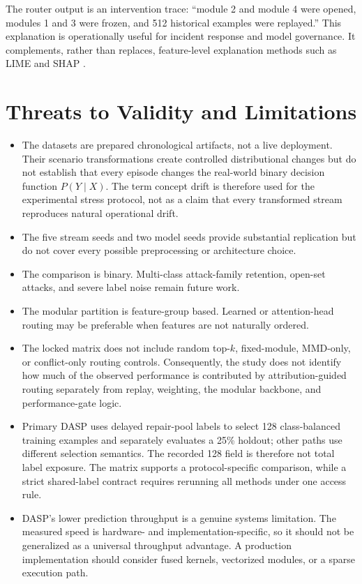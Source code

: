 \documentclass{ieeeaccess}
\newcommand{\discussionhead}[1]{%
  \par\addvspace{7pt}%
  \noindent{\color{greycolor}\bfseries\itshape #1}\par\nobreak\vspace{1pt}\nobreak}
\begin{document}
\discussionhead{Relation to interpretability}
The router output is an intervention trace: ``module 2 and module 4 were opened, modules 1 and 3 were frozen, and 512 historical examples were replayed.'' This explanation is operationally useful for incident response and model governance. It complements, rather than replaces, feature-level explanation methods such as LIME and SHAP \cite{Ribeiro2016LIME,Lundberg2017SHAP,Schwalbe2024XAITaxonomy}.
\section{Threats to Validity and Limitations}
\label{sec:limitations}
\begin{itemize}
    \item The datasets are prepared chronological artifacts, not a live deployment. Their scenario transformations create controlled distributional changes but do not establish that every episode changes the real-world binary decision function $P(Y\mid X)$. The term concept drift is therefore used for the experimental stress protocol, not as a claim that every transformed stream reproduces natural operational drift.
    \item The five stream seeds and two model seeds provide substantial replication but do not cover every possible preprocessing or architecture choice.
    \item The comparison is binary. Multi-class attack-family retention, open-set attacks, and severe label noise remain future work.
    \item The modular partition is feature-group based. Learned or attention-head routing may be preferable when features are not naturally ordered.
    \item The locked matrix does not include random top-$k$, fixed-module, MMD-only, or conflict-only routing controls. Consequently, the study does not identify how much of the observed performance is contributed by attribution-guided routing separately from replay, weighting, the modular backbone, and performance-gate logic.
    \item Primary DASP uses delayed repair-pool labels to select 128 class-balanced training examples and separately evaluates a 25\% holdout; other paths use different selection semantics. The recorded 128 field is therefore not total label exposure. The matrix supports a protocol-specific comparison, while a strict shared-label contract requires rerunning all methods under one access rule.
    \item DASP's lower prediction throughput is a genuine systems limitation. The measured speed is hardware- and implementation-specific, so it should not be generalized as a universal throughput advantage. A production implementation should consider fused kernels, vectorized modules, or a sparse execution path.

\end{itemize}
\end{document}
